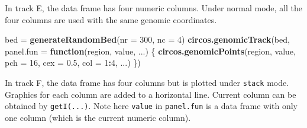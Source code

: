 \documentclass[]{book}
\newenvironment{Shaded}{\begin{snugshade}}{\end{snugshade}}
\newcommand{\KeywordTok}[1]{\textcolor[rgb]{0.13,0.29,0.53}{\textbf{#1}}}
\newcommand{\DataTypeTok}[1]{\textcolor[rgb]{0.13,0.29,0.53}{#1}}
\newcommand{\DecValTok}[1]{\textcolor[rgb]{0.00,0.00,0.81}{#1}}
\newcommand{\FloatTok}[1]{\textcolor[rgb]{0.00,0.00,0.81}{#1}}
\newcommand{\StringTok}[1]{\textcolor[rgb]{0.31,0.60,0.02}{#1}}
\newcommand{\OtherTok}[1]{\textcolor[rgb]{0.56,0.35,0.01}{#1}}
\newcommand{\ControlFlowTok}[1]{\textcolor[rgb]{0.13,0.29,0.53}{\textbf{#1}}}
\newcommand{\OperatorTok}[1]{\textcolor[rgb]{0.81,0.36,0.00}{\textbf{#1}}}
\newcommand{\NormalTok}[1]{#1}
\begin{document}
\begin{Shaded}
\end{Shaded}

In track E, the data frame has four numeric columns. Under normal mode,
all the four columns are used with the same genomic coordinates.

\begin{Shaded}
\begin{Highlighting}[]
\NormalTok{bed =}\StringTok{ }\KeywordTok{generateRandomBed}\NormalTok{(}\DataTypeTok{nr =} \DecValTok{300}\NormalTok{, }\DataTypeTok{nc =} \DecValTok{4}\NormalTok{)}
\KeywordTok{circos.genomicTrack}\NormalTok{(bed, }
    \DataTypeTok{panel.fun =} \ControlFlowTok{function}\NormalTok{(region, value, ...) \{}
        \KeywordTok{circos.genomicPoints}\NormalTok{(region, value, }\DataTypeTok{pch =} \DecValTok{16}\NormalTok{, }\DataTypeTok{cex =} \FloatTok{0.5}\NormalTok{, }\DataTypeTok{col =} \DecValTok{1}\OperatorTok{:}\DecValTok{4}\NormalTok{, ...)}
\NormalTok{\})}
\end{Highlighting}
\end{Shaded}

In track F, the data frame has four columns but is plotted under
\texttt{stack} mode. Graphics for each column are added to a horizontal
line. Current column can be obtained by \texttt{getI(...)}. Note here
\texttt{value} in \texttt{panel.fun} is a data frame with only one
column (which is the current numeric column).
\end{document}
